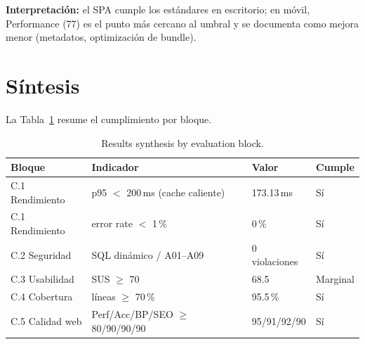 \textbf{Interpretación:} el SPA cumple los estándares en escritorio; en móvil,
Performance (77) es el punto más cercano al umbral y se documenta como mejora
menor (metadatos, optimización de bundle).

\section{Síntesis}
\label{sec:sintesis}

La Tabla~\ref{tab:sintesis} resume el cumplimiento por bloque.

\begin{table}[H]
\centering
\caption{Results synthesis by evaluation block.}
\label{tab:sintesis}
\begin{tabular}{@{}llll@{}}
\toprule
Bloque & Indicador & Valor & Cumple \\
\midrule
C.1 Rendimiento & p95 $<$ 200\,ms (cache caliente) & 173.13\,ms & Sí \\
C.1 Rendimiento & error rate $<$ 1\,\% & 0\,\% & Sí \\
C.2 Seguridad & SQL dinámico / A01--A09 & 0 violaciones & Sí \\
C.3 Usabilidad & SUS $\ge$ 70 & 68.5 & Marginal \\
C.4 Cobertura & líneas $\ge$ 70\,\% & 95.5\,\% & Sí \\
C.5 Calidad web & Perf/Acc/BP/SEO $\ge$ 80/90/90/90 & 95/91/92/90 & Sí \\
\bottomrule
\end{tabular}
\end{table}
